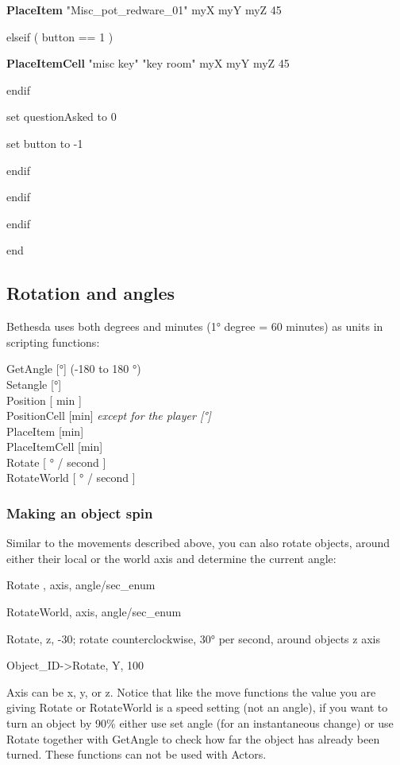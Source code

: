 \documentclass[
]{article}
\begin{document}
\textbf{PlaceItem} "Misc\_pot\_redware\_01" myX myY myZ 45

elseif ( button == 1 )

\textbf{PlaceItemCell} "misc key" "key room" myX myY myZ 45

endif

set questionAsked to 0

set button to -1

endif

endif

endif

end

\hypertarget{rotation-and-angles}{%
\subsection{\texorpdfstring{Rotation and angles
}{Rotation and angles }}\label{rotation-and-angles}}

Bethesda uses both degrees and minutes (1° degree = 60 minutes) as units
in scripting functions:

GetAngle {[}°{]} (-180 to 180 °)\\
Setangle {[}°{]}\\
Position {[} min {]}\\
PositionCell {[}min{]} \emph{except for the player {[}°{]}}\\
PlaceItem {[}min{]}\\
PlaceItemCell {[}min{]}\\
Rotate {[} ° / second {]}\\
RotateWorld {[} ° / second {]}

\hypertarget{making-an-object-spin}{%
\subsubsection{Making an object spin}\label{making-an-object-spin}}

Similar to the movements described above, you can also rotate objects,
around either their local or the world axis and determine the current
angle:

Rotate , axis, angle/sec\_enum

RotateWorld, axis, angle/sec\_enum

Rotate, z, -30; rotate counterclockwise, 30° per second, around objects
z axis

Object\_ID-\textgreater Rotate, Y, 100

Axis can be x, y, or z. Notice that like the move functions the value
you are giving Rotate or RotateWorld is a speed setting (not an angle),
if you want to turn an object by 90\% either use set angle (for an
instantaneous change) or use Rotate together with GetAngle to check how
far the object has already been turned. These functions can not be used
with Actors.
\end{document}
